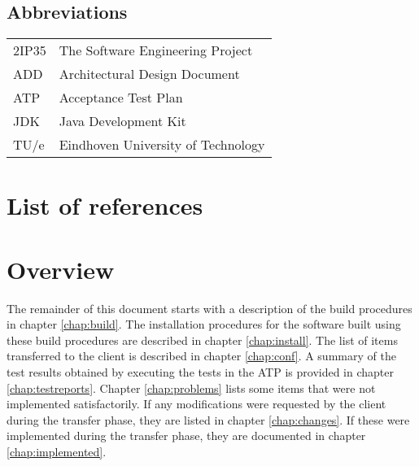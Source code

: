 \subsection{Abbreviations}
\begin{tabular}{l|l}
2IP35 & The Software Engineering Project \\
ADD & Architectural Design Document \\
ATP & Acceptance Test Plan \\
JDK & Java Development Kit \\
TU/e  & Eindhoven University of Technology \\
\end{tabular}

\section{List of references}


\section{Overview}
The remainder of this document starts with a description of the build procedures in chapter \ref{chap:build}. The installation procedures for the software built using these build procedures are described in chapter \ref{chap:install}. The list of items transferred to the client is described in chapter \ref{chap:conf}. A summary of the test results obtained by executing the tests in the ATP \cite{atp} is provided in chapter \ref{chap:testreports}. Chapter \ref{chap:problems} lists some items that were not implemented satisfactorily. If any modifications were requested by the client during the transfer phase, they are listed in chapter \ref{chap:changes}. If these were implemented during the transfer phase, they are documented in chapter \ref{chap:implemented}.